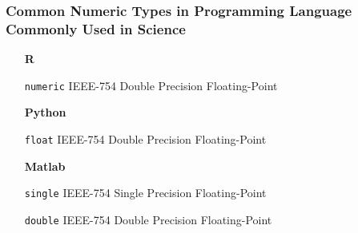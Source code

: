 \begin{frame}

\frametitle{Common Numeric Types in Programming Language Commonly Used in Science}

\begin{itemize}

\item[\textbf{R}] \hfill\\

\item[\texttt{numeric}] IEEE-754 Double Precision Floating-Point

\item[\textbf{Python}] \hfill\\

\item[\texttt{float}] IEEE-754 Double Precision Floating-Point

\item[\textbf{Matlab}] \hfill\\

\item[\texttt{single}] IEEE-754 Single Precision Floating-Point

\item[\texttt{double}] IEEE-754 Double Precision Floating-Point

\end{itemize}

\end{frame}
